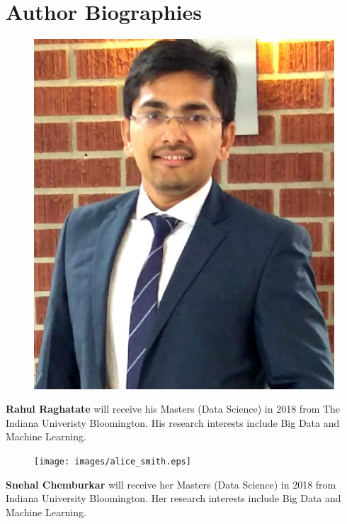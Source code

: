 \documentclass[9pt,twocolumn,twoside]{../../styles/osajnl}
\begin{document}


\section*{Author Biographies}
\begingroup \setlength\intextsep{0pt}
\begin{minipage}[t][3.2cm][t]{1.0\columnwidth}
  \begin{figure}
    \includegraphics[width=0.25\columnwidth]{images/rahul_thumbnail.jpg}
  \end{figure}
  \noindent
  {\bfseries Rahul Raghatate} will receive his Masters (Data Science)
  in 2018 from The Indiana Univeristy Bloomington. His research
  interests include Big Data and Machine Learning.
\end{minipage}
\begin{minipage}[t][3.2cm][t]{1.0\columnwidth} %
  \begin{figure}
    \texttt{[image: images/alice\_smith.eps]}
  \end{figure}
  \noindent
  {\bfseries Snehal Chemburkar} will receive her Masters (Data
  Science) in 2018 from Indiana University Bloomington. Her research
  interests include Big Data and Machine Learning.
\end{minipage}
\endgroup

\appendix
\end{document}
